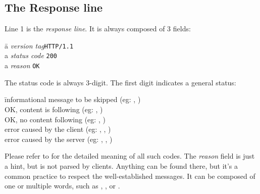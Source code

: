 
\subsection{The Response line}

Line 1 is the \emph{response line}. It is always composed of 3 fields:

\begin{tabbing}
\qquad \= {a \emph{version tag}}\qquad\= \verb|HTTP/1.1| \\
\> {a \emph{status code}}			\> \verb|200| \\
\> {a \emph{reason}}	\> \verb|OK|
\end{tabbing}

The status code is always 3-digit. The first digit indicates a general status:
\begin{tabbing}
\qquad {}	\qquad \= informational message to be skipped (eg: , ) \\
\qquad {}		\> OK, content is following   (eg: , ) \\
\qquad {}		\> OK, no content following   (eg: , ) \\
\qquad {}		\> error caused by the client (eg: , , ) \\
\qquad {}		\> error caused by the server (eg: , , ) \\
\end{tabbing}

Please refer to  for the detailed meaning of all such codes. The
\emph{reason} field is just a hint, but is not parsed by clients. Anything can be
found there, but it's a common practice to respect the well-established
messages. It can be composed of one or multiple words, such as , 
, or .

